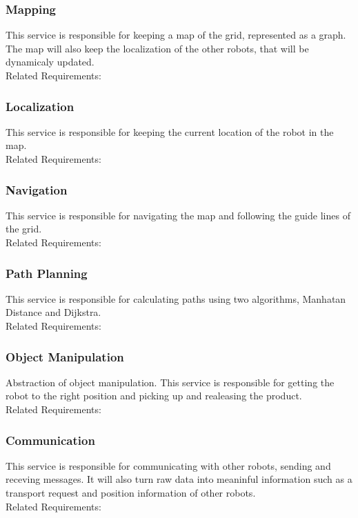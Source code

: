 \subsubsection*{Mapping}
This service is responsible for keeping a map of the grid, represented as a graph. The map will also keep the localization of the other robots, that will be dynamicaly updated.
\\Related Requirements:

\subsubsection*{Localization}
This service is responsible for keeping the current location of the robot in the map. 
\\Related Requirements:

\subsubsection*{Navigation}
This service is responsible for navigating the map and following the guide lines of the grid. 
\\Related Requirements:

\subsubsection*{Path Planning}
This service is responsible for calculating paths using two algorithms, Manhatan Distance and Dijkstra. 
\\Related Requirements:

\subsubsection*{Object Manipulation}
Abstraction of object manipulation. This service is responsible for getting the robot to the right position and picking up and realeasing the product.
\\Related Requirements:

\subsubsection*{Communication}
This service is responsible for communicating with other robots, sending and receving messages. It will also turn raw data into meaninful information such as a transport request and position information of other robots. 
\\Related Requirements:

